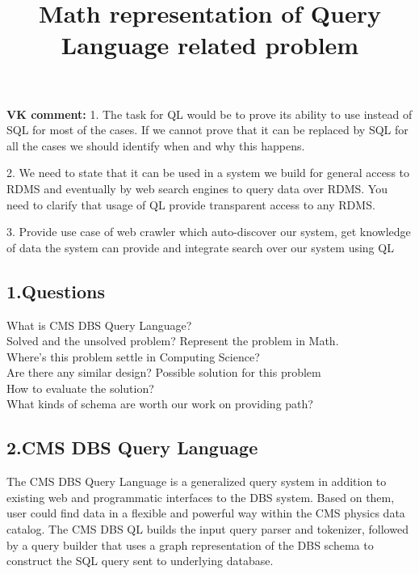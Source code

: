 \textheight 215mm
\textwidth 145mm

\oddsidemargin 0pt
\evensidemargin 0pt
\topmargin 0pt
\title{Math representation of Query Language related problem}
\maketitle
\vspace{0.5cm}

{\bf VK comment:} 
1. The task for QL would be to prove its ability to use
instead of SQL for most of the cases. If we cannot prove that it can be replaced by SQL for
all the cases we should identify when and why this happens.

2. We need to state that it can be used in a system we build for general
access to RDMS and eventually by web search engines to query data over RDMS.
You need to clarify that usage of QL provide transparent access to any RDMS.

3. Provide use case of web crawler which auto-discover our system, get knowledge
of data the system can provide and integrate search over our system using QL

\begin{center}
{\section*{{\normalsize\bf 1.Questions}}}
\end{center}
\setcounter{section}{1}
What is CMS DBS Query Language?\\
Solved and the unsolved problem? Represent the problem in Math.\\
Where's this problem settle in Computing Science? \\
Are there any similar design? Possible solution for this problem\\
How to evaluate the solution?\\
What kinds of schema are worth our work on providing path?
\begin{center}
{\section*{{\normalsize\bf 2.CMS DBS Query Language}}}
\end{center}
\setcounter{section}{2}
The CMS DBS Query Language is a generalized query system in addition to existing web and programmatic interfaces to the DBS system. Based on them, user could find data in a flexible and powerful way within the CMS physics data catalog. The CMS DBS QL builds the input query parser and tokenizer, followed by a query builder that uses a graph representation of the DBS schema to construct the SQL query sent to underlying database.

